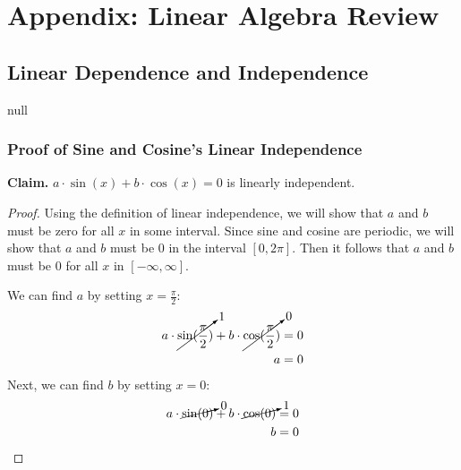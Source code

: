 \chapter{Appendix: Linear Algebra Review}
\section{Linear Dependence and Independence}
null
\subsection{Proof of Sine and Cosine's Linear Independence}
\textbf{Claim. } $a \cdot \sin(x) + b \cdot \cos(x) = 0$ is linearly independent.
    \begin{proof}
        Using the definition of linear independence, we will show that $a$ and $b$ must be zero for all $x$ in some interval.  Since sine and cosine are periodic, we will show that $a$ and $b$ must be $0$ in the interval $[0, 2\pi]$.  Then it follows that $a$ and $b$ must be $0$ for all $x$ in $[-\infty, \infty]$.
        
        \vspace{0.5cm}
        \noindent
        We can find $a$ by setting $x = \frac{\pi}{2}$:
        \begin{align*}
            a \cdot \cancelto{1}{\sin(\frac{\pi}{2})} + b \cdot \cancelto{0}{\cos(\frac{\pi}{2})} &= 0\\
            a &= 0
        \end{align*}
        Next, we can find $b$ by setting $x = 0$:
        \begin{align*}
            a \cdot \cancelto{0}{\sin(0)} + b \cdot \cancelto{1}{\cos(0)} &= 0\\
            b &= 0
        \end{align*}
    \end{proof}
